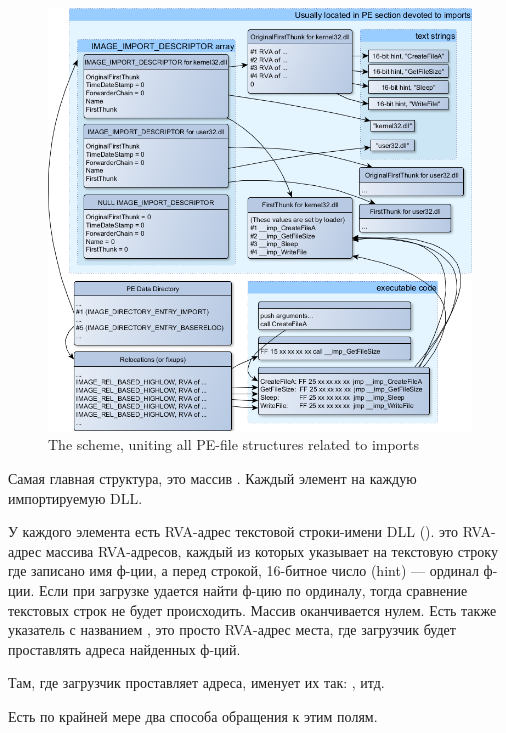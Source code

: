 \begin{figure}[ht!]
\centering
\includegraphics[scale=0.66]{PE/unnamed0.png}
\caption{
{The scheme, uniting all PE-file structures related to imports}}
\end{figure}

Самая главная структура, это массив . Каждый элемент на каждую импортируемую DLL.

У каждого элемента есть \ac{RVA}-адрес текстовой строки-имени DLL ().  это \ac{RVA}-адрес
массива \ac{RVA}-адресов, каждый из которых указывает на текстовую строку где записано имя ф-ции, а перед строкой, 
16-битное число (hint) --- ординал ф-ции. Если при загрузке удается найти ф-цию по ординалу, тогда сравнение текстовых
строк не будет происходить. Массив оканчивается нулем. Есть также указатель с названием , 
это просто \ac{RVA}-адрес места, где загрузчик будет проставлять адреса найденных ф-ций.

Там, где загрузчик проставляет адреса, \IDA именует их так: , итд.

Есть по крайней мере два способа обращения к этим полям.

